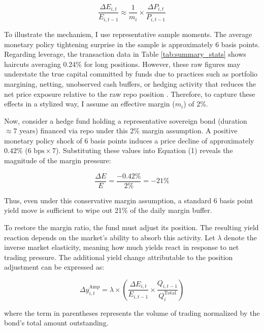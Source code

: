 \documentclass[english, 11pt, oneside]{article}
\begin{document}
\begin{equation}
\frac{\Delta E_{i,t}}{E_{i,t-1}} \approx \frac{1}{m_i} \times \frac{\Delta P_{i,t}}{P_{i,t-1}}
\end{equation}

To illustrate the mechanism, I use representative sample moments. The average monetary policy tightening surprise in the sample is approximately 6 basis points. Regarding leverage, the transaction data in Table \ref{tab:summary_stats} shows haircuts averaging 0.24\% for long positions. However, these raw figures may understate the true capital committed by funds due to practices such as portfolio margining, netting, unobserved cash buffers, or hedging activity that reduces the net price exposure relative to the raw repo position \citep{hempel2023, hill2025, hermes2025a}. Therefore, to capture these effects in a stylized way, I assume an effective margin ($m_i$) of 2\%.

Now, consider a hedge fund holding a representative sovereign bond (duration $\approx 7$ years) financed via repo under this 2\% margin assumption. A positive monetary policy shock of 6 basis points induces a price decline of approximately $0.42\%$ ($6\text{ bps} \times 7$). Substituting these values into Equation (1) reveals the magnitude of the margin pressure:

\begin{equation*}
\frac{\Delta E}{E} = \frac{-0.42\%}{2\%} = -21\%
\end{equation*}

Thus, even under this conservative margin assumption, a standard 6 basis point yield move is sufficient to wipe out 21\% of the daily margin buffer.

To restore the margin ratio, the fund must adjust its position. The resulting yield reaction depends on the market's ability to absorb this activity. Let $\lambda$ denote the inverse market elasticity, meaning how much yields react in response to net trading pressure. The additional yield change attributable to the position adjustment can be expressed as:

\begin{equation}
\Delta y_{i,t}^{\text{Amp}} = \lambda \times \left( \frac{\Delta E_{i,t}}{E_{i,t-1}} \times \frac{Q_{i,t-1}}{Q^{\text{Total}}_{i}} \right)
\end{equation}

where the term in parentheses represents the volume of trading normalized by the bond's total amount outstanding.
\end{document}
